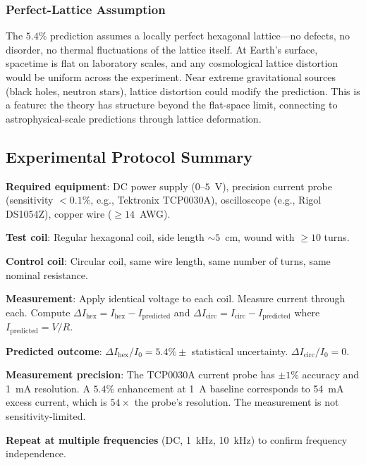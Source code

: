 \documentclass[12pt,a4paper]{article}
\theoremstyle{plain}
\theoremstyle{definition}
\begin{document}
\subsubsection{Perfect-Lattice Assumption}

The $5.4\%$ prediction assumes a locally perfect hexagonal lattice---no defects, no disorder, no thermal fluctuations of the lattice itself. At Earth's surface, spacetime is flat on laboratory scales, and any cosmological lattice distortion would be uniform across the experiment. Near extreme gravitational sources (black holes, neutron stars), lattice distortion could modify the prediction. This is a feature: the theory has structure beyond the flat-space limit, connecting to astrophysical-scale predictions through lattice deformation.

\subsection{Experimental Protocol Summary}\label{sec:protocol}

\textbf{Required equipment}: DC power supply ($0$--$5$~V), precision current probe (sensitivity $<0.1\%$, e.g., Tektronix TCP0030A), oscilloscope (e.g., Rigol DS1054Z), copper wire ($\geq 14$~AWG).

\textbf{Test coil}: Regular hexagonal coil, side length $\sim 5$~cm, wound with $\geq 10$ turns.

\textbf{Control coil}: Circular coil, same wire length, same number of turns, same nominal resistance.

\textbf{Measurement}: Apply identical voltage to each coil. Measure current through each. Compute $\Delta I_{\mathrm{hex}} = I_{\mathrm{hex}} - I_{\mathrm{predicted}}$ and $\Delta I_{\mathrm{circ}} = I_{\mathrm{circ}} - I_{\mathrm{predicted}}$ where $I_{\mathrm{predicted}} = V/R$.

\textbf{Predicted outcome}: $\Delta I_{\mathrm{hex}}/I_0 = 5.4\% \pm$ statistical uncertainty. $\Delta I_{\mathrm{circ}}/I_0 = 0$.

\textbf{Measurement precision}: The TCP0030A current probe has $\pm 1\%$ accuracy and 1~mA resolution. A $5.4\%$ enhancement at 1~A baseline corresponds to 54~mA excess current, which is $54\times$ the probe's resolution. The measurement is not sensitivity-limited.

\textbf{Repeat at multiple frequencies} (DC, 1~kHz, 10~kHz) to confirm frequency independence.
\end{document}
